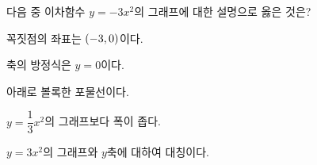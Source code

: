 다음 중 이차함수 $y=-3x^2$의 그래프에 대한 설명으로 옳은 것은?
\begin{choicesv}{\rule[-3ex]{0pt}{8ex}꼭짓점의 좌표는 $(-3{,}\mkern3mu 0)$이다.}{\rule[-3ex]{0pt}{8ex}축의 방정식은 $y=0$이다.}{\rule[-3ex]{0pt}{8ex}아래로 볼록한 포물선이다.}{\rule[-3ex]{0pt}{8ex}$y=\dfrac{1}{3}x^2$의 그래프보다 폭이 좁다.}{\rule[-3ex]{0pt}{8ex}$y=3x^2$의 그래프와 $y$축에 대하여 대칭이다.}\end{choicesv}
